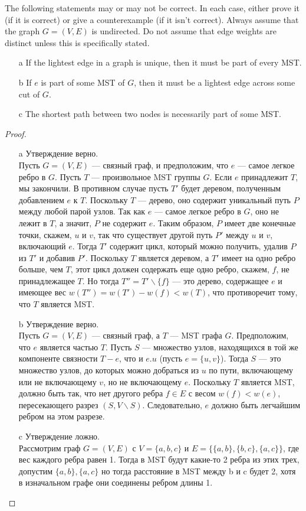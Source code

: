 \begin{prob}
The following statements may or may not be correct. In each case, either prove it (if it is correct) or give a counterexample (if it isn't correct). Always assume that the graph $G=(V, E)$ is undirected. Do not assume that edge weights are distinct unless this is specifically stated.
\begin{itemize}
\item[a] If the lightest edge in a graph is unique, then it must be part of every MST.
\item[b] If $e$ is part of some MST of $G$, then it must be a lightest edge across some cut of $G$.
\item[c] The shortest path between two nodes is necessarily part of some MST.
\end{itemize}
\end{prob}
\vskip 0.2in
\begin{proof}
\begin{itemize}
\item[]
\item[a] Утверждение верно.\\ \noindent
    Пусть $G=(V, E)$ — связный граф, и предположим, что $e$ — самое легкое ребро в $G$. Пусть $T$ — произвольное MST группы $G$. Если $e$ принадлежит $T$, мы закончили. В противном случае пусть $T'$ будет деревом, полученным добавлением $e$ к $T$. Поскольку $T$ — дерево, оно содержит уникальный путь $P$ между любой парой узлов. Так как $e$ — самое легкое ребро в $G$, оно не лежит в $T$, а значит, $P$ не содержит $e$. Таким образом, $P$ имеет две конечные точки, скажем, $u$ и $v$, так что существует другой путь $P'$ между $u$ и $v$, включающий $e$. Тогда $T'$ содержит цикл, который можно получить, удалив $P$ из $T'$ и добавив $P'$. Поскольку $T$ является деревом, а $T'$ имеет на одно ребро больше, чем $T$, этот цикл должен содержать еще одно ребро, скажем, $f$, не принадлежащее $T$. Но тогда $T''=T'\backslash \{f\}$ — это дерево, содержащее $e$ и имеющее вес $w(T'')=w(T')-w(f)<w(T)$, что противоречит тому, что $T$ является MST.
\item[b] Утверждение верно.\\ \noindent
    Пусть $G=(V,E)$ — связный граф, а $T$ — MST графа $G$. Предположим, что $e$ является частью $T$. Пусть $S$ — множество узлов, находящихся в той же компоненте связности $T-e$, что и $e.u$ (пусть $e=\{u,v\}$). Тогда $S$ — это множество узлов, до которых можно добраться из $u$ по пути, включающему или не включающему $v$, но не включающему $e$. Поскольку $T$ является MST, должно быть так, что нет другого ребра $f\in E$ с весом $w(f)<w(e)$, пересекающего разрез $(S,V\backslash S )$. Следовательно, $e$ должно быть легчайшим ребром на этом разрезе.
\item[c] Утверждение ложно.\\ \noindent
    Рассмотрим граф $G=(V,E)$ с $V=\{a,b,c\}$ и $E=\{\{a,b\},\{b,c\},\{a,c\}\}$, где вес каждого ребра равен 1. Тогда в MST будут какие-то 2 ребра из этих трех, допустим $\{a,b\},\{a,c\}$ но тогда расстояние в MST между b и c будет 2, хотя в изначальном графе они соединены ребром длины 1.
\end{itemize}
\end{proof}
\vskip 0.6in

